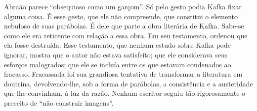 Abraão parece ``obsequioso como um garçom''. Só pelo gesto podia Kafka
fixar alguma coisa. É esse gesto, que ele não compreende, que constitui
o elemento nebuloso de suas parábolas. É dele que parte a obra literária
de Kafka. Sabe-se como ele era reticente com relação a essa obra. Em seu
testamento, ordenou que ela fosse destruída. Esse testamento, que nenhum
estudo sobre Kafka pode ignorar, mostra que o autor não estava
satisfeito; que ele considerava seus esforços malogrados; que ele se
incluía entre os que estavam condenados ao fracasso. Fracassada foi sua
grandiosa tentativa de transformar a literatura em doutrina,
devolvendo-lhe, sob a forma de parábolas, a consistência e a austeridade
que lhe convinham, à luz da razão. Nenhum escritor seguiu tão
rigorosamente o preceito de ``não construir imagens''.


\begin{quote}
\end{quote}

